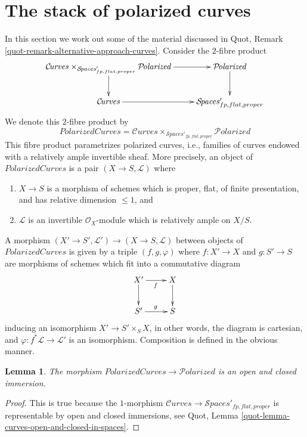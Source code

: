 \documentclass{stacks-project}
\theoremstyle{plain}
\newtheorem{lemma}[subsection]{Lemma}
\theoremstyle{definition}
\theoremstyle{remark}
\numberwithin{equation}{subsection}
\def\Spacesstack{\mathcal{S}\!\mathit{paces}}
\def\Curvesstack{\mathcal{C}\!\mathit{urves}}
\def\Polarizedstack{\mathcal{P}\!\mathit{olarized}}
\begin{document}
\section{The stack of polarized curves}
\label{section-polarized-curves}

\noindent
In this section we work out some of the material
discussed in Quot, Remark \ref{quot-remark-alternative-approach-curves}.
Consider the $2$-fibre product
$$
\xymatrix{
\Curvesstack \times_{\Spacesstack'_{fp, flat, proper}}
\Polarizedstack \ar[r] \ar[d] &
\Polarizedstack \ar[d] \\
\Curvesstack \ar[r] &
\Spacesstack'_{fp, flat, proper}
}
$$
We denote this $2$-fibre product by
$$
\textit{PolarizedCurves} =
\Curvesstack
\times_{\Spacesstack'_{fp, flat, proper}}
\Polarizedstack
$$
This fibre product parametrizes polarized curves, i.e., families
of curves endowed with a relatively ample invertible sheaf.
More precisely, an object of
$\textit{PolarizedCurves}$
is a pair $(X \to S, \mathcal{L})$ where
\begin{enumerate}
\item $X \to S$ is a morphism of schemes which is proper, flat,
of finite presentation, and has relative dimension $\leq 1$, and
\item $\mathcal{L}$ is an invertible $\mathcal{O}_X$-module
which is relatively ample on $X/S$.
\end{enumerate}
A morphism $(X' \to S', \mathcal{L}') \to (X \to S, \mathcal{L})$
between objects of
$\textit{PolarizedCurves}$
is given by a triple $(f, g, \varphi)$
where $f : X' \to X$ and $g : S' \to S$
are morphisms of schemes which fit into a commutative diagram
$$
\xymatrix{
X' \ar[d] \ar[r]_f & X \ar[d] \\
S' \ar[r]^g & S
}
$$
inducing an isomorphism $X' \to S' \times_S X$, in other words, the
diagram is cartesian, and $\varphi : f^*\mathcal{L} \to \mathcal{L}'$
is an isomorphism. Composition is defined in the obvious manner.

\begin{lemma}
\label{lemma-polarized-curves-in-polarized}
The morphism
$\textit{PolarizedCurves} \to
\Polarizedstack$ is an open and closed immersion.
\end{lemma}

\begin{proof}
This is true because the $1$-morphism
$\Curvesstack \to \Spacesstack'_{fp, flat, proper}$
is representable by open and closed immersions, see
Quot, Lemma \ref{quot-lemma-curves-open-and-closed-in-spaces}.
\end{proof}
\end{document}
